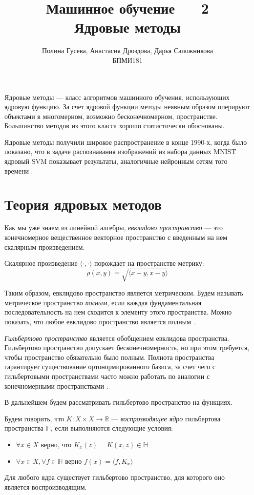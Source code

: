 \documentclass[12pt]{article}
\title{Машинное обучение --- 2 \\
        \large Ядровые методы}
\author{Полина Гусева, Анастасия Дроздова, Дарья Сапожникова \\
        \large БПМИ181}
\date{}
\newcommand{\R}{\mathbb{R}}
\begin{document}
\maketitle

\vspace{0.5in}

\par Ядровые методы --- класс алгоритмов машинного обучения, использующих ядровую функцию. За счет ядровой функции методы неявным образом оперируют объектами в многомерном, возможно бесконечномерном, пространстве. Большинство методов из этого класса хорошо статистически обоснованы.
\par Ядровые методы получили широкое распространение в конце 1990-х, когда было показано, что в задаче распознавания изображений из набора данных MNIST ядровый SVM показывает результаты, аналогичные нейронным сетям того времени \cite{mnistwebsite}.

\section*{Теория ядровых методов}
\par Как мы уже знаем из линейной алгебры, \textit{евклидово пространство} --- это конечномерное вещественное векторное пространство с введенным на нем скалярным произведением. 
\par Скалярное произведение $ \langle \cdot, \cdot \rangle $ порождает на пространстве метрику:
\[
    \rho(x, y) = \sqrt{\langle x - y, x - y \rangle}
\]
\par Таким образом, евклидово пространство является метрическим. Будем называть метрическое пространство \textit{полным}, если каждая фундаментальная последовательность на нем сходится к элементу этого пространства. Можно показать, что любое евклидово пространство является полным \cite{rudineuclideanproof}.
\par \textit{Гильбертово пространство} является обобщением евклидова пространства. Гильбертово пространство допускает бесконечномерность, но при этом требуется, чтобы пространство обязательно было полным. Полнота пространства гарантирует существование ортонормированного базиса, за счет чего с гильбертовыми пространствами часто можно работать по аналогии с конечномерными пространствами \cite{useofcompleteness}.

\par В дальнейшем будем рассматривать гильбертово пространство на функциях.

\par Будем говорить, что $ K : X \times X \to \R $ --- \textit{воспрозводящее ядро} гильбертова пространства $ \mathbb{H} $, если выполняются следующие условия:
\begin{itemize}
    \item $ \forall x \in X $ верно, что $ K_x(z) = K(x, z) \in \mathbb{H} $
    \item $ \forall x \in X, \forall f \in \mathbb{H} $ верно $ f(x) = \langle f, K_x \rangle $
\end{itemize}
\par Для любого ядра существует гильбертово пространство, для которого оно является воспроизводящим.
\end{document}
